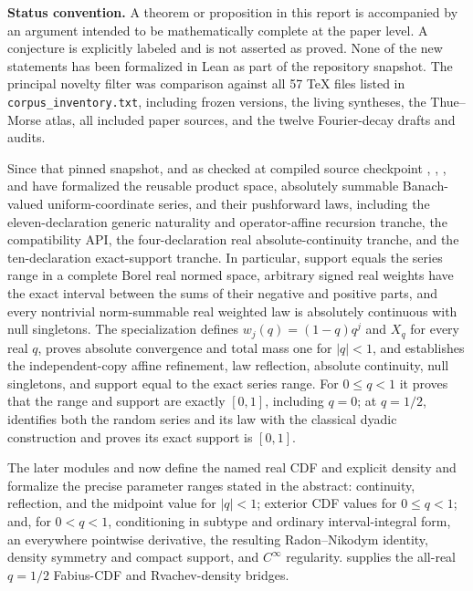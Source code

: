 \documentclass[11pt]{article}
\numberwithin{equation}{section}
\theoremstyle{definition}
\theoremstyle{remark}
\begin{document}
\begin{boxedremark}
\textbf{Status convention.}
A theorem or proposition in this report is accompanied by an argument intended to be
mathematically complete at the paper level.  A conjecture is explicitly labeled and is not
asserted as proved.  None of the new statements has been formalized in Lean as part of the
repository snapshot.  The principal novelty filter was comparison against all 57 TeX files
listed in \texttt{corpus\_inventory.txt}, including frozen versions, the living syntheses,
the Thue--Morse atlas, all included paper sources, and the twelve Fourier-decay drafts and
audits.

Since that pinned snapshot, and as checked at compiled source checkpoint
, ,
, and  have
formalized the reusable product space, absolutely summable Banach-valued uniform-coordinate
series, and their pushforward laws, including the eleven-declaration generic naturality and
operator-affine recursion tranche, the compatibility API, the four-declaration real
absolute-continuity tranche, and the ten-declaration exact-support tranche.  In particular,
support equals the series range in a complete Borel real normed space, arbitrary signed real
weights have the exact interval between the sums of their negative and positive parts, and
every nontrivial norm-summable real weighted law is absolutely continuous with null
singletons.  The specialization
 defines
$w_j(q)=(1-q)q^j$ and $X_q$ for every real $q$, proves absolute convergence and total mass
one for $|q|<1$, and establishes the independent-copy affine refinement, law reflection,
absolute continuity, null singletons, and support equal to the exact series range.  For
$0\le q<1$ it proves that the range and support are exactly $[0,1]$, including $q=0$; at
$q=1/2$,
 identifies both the random series and its law with
the classical dyadic construction and proves its exact support is $[0,1]$.

The later modules  and
 now define the named real CDF and explicit density and
formalize the precise parameter ranges stated in the abstract: continuity, reflection, and
the midpoint value for \(|q|<1\); exterior CDF values for \(0\le q<1\); and, for
\(0<q<1\), conditioning in subtype and ordinary interval-integral form, an everywhere
pointwise derivative, the resulting Radon--Nikodym identity, density symmetry and compact
support, and \(C^\infty\) regularity.   supplies the
all-real \(q=1/2\) Fabius-CDF and Rvachev-density bridges.
\end{boxedremark}
\end{document}
